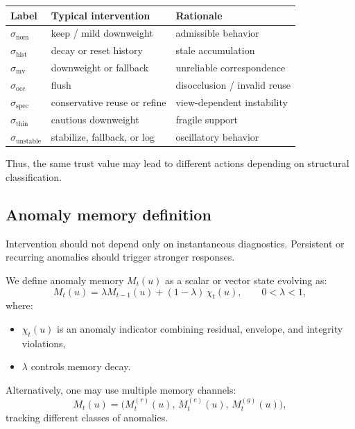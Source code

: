 \documentclass[11pt]{article}
\theoremstyle{definition}
\theoremstyle{plain}
\begin{document}
\begin{center}
\begin{tabular}{lll}
\toprule
Label & Typical intervention & Rationale \\
\midrule
$\sigma_{\mathrm{nom}}$ & keep / mild downweight & admissible behavior \\
$\sigma_{\mathrm{hist}}$ & decay or reset history & stale accumulation \\
$\sigma_{\mathrm{mv}}$ & downweight or fallback & unreliable correspondence \\
$\sigma_{\mathrm{occ}}$ & flush & disocclusion / invalid reuse \\
$\sigma_{\mathrm{spec}}$ & conservative reuse or refine & view-dependent instability \\
$\sigma_{\mathrm{thin}}$ & cautious downweight & fragile support \\
$\sigma_{\mathrm{unstable}}$ & stabilize, fallback, or log & oscillatory behavior \\
\bottomrule
\end{tabular}
\end{center}

Thus, the same trust value may lead to different actions depending on structural classification.


\subsection{Anomaly memory definition}

Intervention should not depend only on instantaneous diagnostics. Persistent or recurring anomalies should trigger stronger responses.

We define anomaly memory $M_t(u)$ as a scalar or vector state evolving as:
\begin{equation}
M_t(u)=\lambda M_{t-1}(u) + (1-\lambda)\,\chi_t(u),
\qquad 0<\lambda<1,
\end{equation}
where:
\begin{itemize}[leftmargin=1.5em]
    \item $\chi_t(u)$ is an anomaly indicator combining residual, envelope, and integrity violations,
    \item $\lambda$ controls memory decay.
\end{itemize}

Alternatively, one may use multiple memory channels:
\begin{equation}
M_t(u)=\bigl(M^{(r)}_t(u),\,M^{(e)}_t(u),\,M^{(g)}_t(u)\bigr),
\end{equation}
tracking different classes of anomalies.
\end{document}
